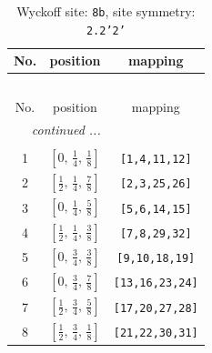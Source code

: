 \documentclass[fleqn,8pt]{jsarticle}
\begin{document}
\begin{longtable}{ccc}
\caption{Wyckoff site: {\tt 8b}, site symmetry: {\tt 2.2'2'}}
 \\
 \hline \hline
No. & position & mapping \\ \hline \endfirsthead

\multicolumn{2}{l}{\tablename\ \thetable{}} \\
 \hline \hline
No. & position & mapping \\ \hline \endhead

 \hline \hline
\multicolumn{2}{r}{\footnotesize\it continued ...} \\ \endfoot

 \hline \hline
\multicolumn{2}{r}{} \\ \endlastfoot

1 & $\left[ 0,\, \frac{1}{4},\, \frac{1}{8} \right]$ & {\tt [1,4,11,12]} \\ \hline
2 & $\left[ \frac{1}{2},\, \frac{1}{4},\, \frac{7}{8} \right]$ & {\tt [2,3,25,26]} \\ \hline
3 & $\left[ 0,\, \frac{1}{4},\, \frac{5}{8} \right]$ & {\tt [5,6,14,15]} \\ \hline
4 & $\left[ \frac{1}{2},\, \frac{1}{4},\, \frac{3}{8} \right]$ & {\tt [7,8,29,32]} \\ \hline
5 & $\left[ 0,\, \frac{3}{4},\, \frac{3}{8} \right]$ & {\tt [9,10,18,19]} \\ \hline
6 & $\left[ 0,\, \frac{3}{4},\, \frac{7}{8} \right]$ & {\tt [13,16,23,24]} \\ \hline
7 & $\left[ \frac{1}{2},\, \frac{3}{4},\, \frac{5}{8} \right]$ & {\tt [17,20,27,28]} \\ \hline
8 & $\left[ \frac{1}{2},\, \frac{3}{4},\, \frac{1}{8} \right]$ & {\tt [21,22,30,31]} \\
\end{longtable}
\renewcommand{\arraystretch}{1.2}
\end{document}
